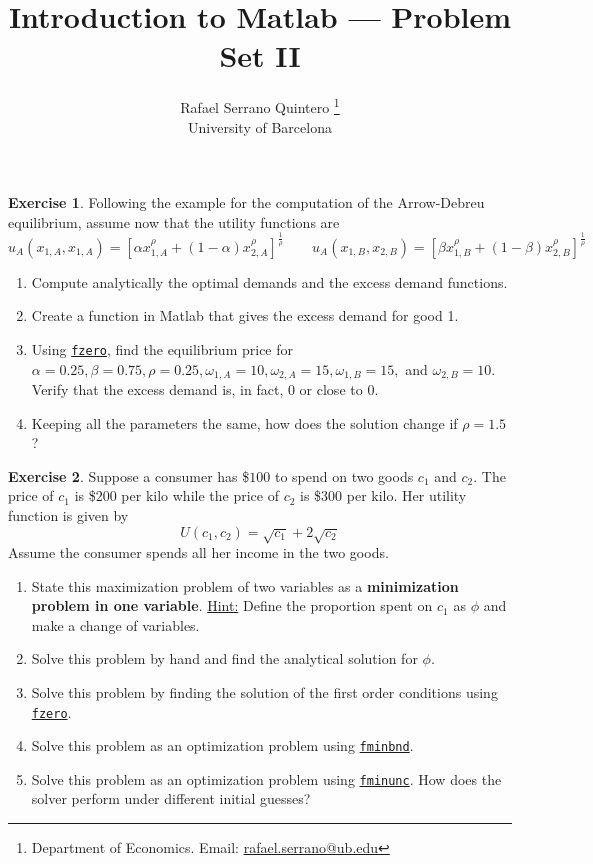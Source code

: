 \documentclass[a4paper,11pt]{article}
\title{\textbf{Introduction to Matlab --- Problem Set II}}
\author{Rafael Serrano Quintero
\thanks{Department of Economics. Email: \href{mailto:rafael.serrano@ub.edu}{rafael.serrano@ub.edu}} \\
University of Barcelona \\}
\date{}
\theoremstyle{definition}
\newtheorem{exercise}{Exercise}
\begin{document}
\VerbatimFootnotes

\maketitle

\begin{exercise}
  Following the example for the computation of the Arrow-Debreu equilibrium, assume now that the utility functions are 
  \[
    u_A(x_{1,A}, x_{1,A}) = \left[ \alpha x_{1,A}^{\rho} + (1 - \alpha) x_{2,A}^{\rho} \right]^{\frac{1}{\rho} } \qquad 
    u_A(x_{1,B}, x_{2,B}) = \left[ \beta x_{1,B}^{\rho} + (1 - \beta) x_{2,B}^{\rho} \right]^{\frac{1}{\rho} }
  \]
  \begin{enumerate}
    \item Compute analytically the optimal demands and the excess demand functions. 
    \item Create a function in Matlab that gives the excess demand for good 1. 
    \item Using \href{https://es.mathworks.com/help/matlab/ref/fzero.html}{\texttt{fzero}}, find the equilibrium price for $\alpha = 0.25, \beta = 0.75, \rho = 0.25, \omega_{1,A} = 10, \omega_{2,A} = 15, \omega_{1,B} = 15,$ and $\omega_{2,B} = 10$. Verify that the excess demand is, in fact, $0$ or close to $0$.
    \item Keeping all the parameters the same, how does the solution change if $\rho = 1.5$?
  \end{enumerate}
\end{exercise}

\begin{exercise}
Suppose a consumer has \$$100$ to spend on two goods $c_1$ and $c_2$. The price of $c_1$ is \$$200$ per kilo while the price of $c_2$ is \$$300$ per kilo. Her utility function is given by
\[
U(c_1, c_2) = \sqrt{c_1} + 2\sqrt{c_2}
\]
Assume the consumer spends all her income in the two goods.
\begin{enumerate}
    \item State this maximization problem of two variables as a \textbf{minimization problem in one variable}. \underline{Hint:} Define the proportion spent on $c_1$ as $\phi$ and make a change of variables.
    \item Solve this problem by hand and find the analytical solution for $\phi$.
    \item Solve this problem by finding the solution of the first order conditions using \href{https://es.mathworks.com/help/matlab/ref/fzero.html}{\texttt{fzero}}.
    \item Solve this problem as an optimization problem using \href{https://es.mathworks.com/help/matlab/ref/fminbnd.html}{\texttt{fminbnd}}.
    \item Solve this problem as an optimization problem using \href{https://es.mathworks.com/help/optim/ug/fminunc.html}{\texttt{fminunc}}. How does the solver perform under different initial guesses?
\end{enumerate}
\end{exercise}
\end{document}
